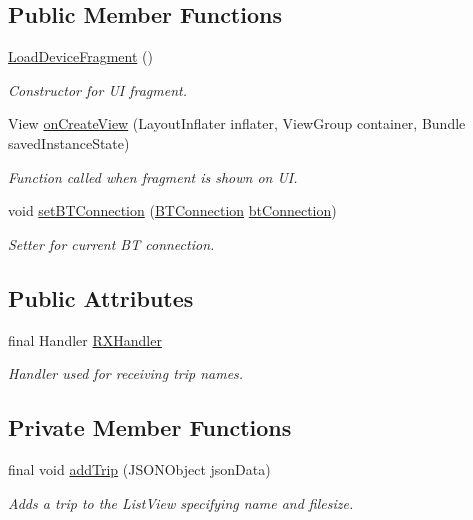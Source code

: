\subsection*{Public Member Functions}
\begin{DoxyCompactItemize}
\item 
\hyperlink{classcom_1_1jack_1_1motorbikestatistics_1_1_load_device_fragment_aaa7330cd6556cd8a87e8b226d796d508}{Load\+Device\+Fragment} ()
\begin{DoxyCompactList}\small\item\em Constructor for UI fragment. \end{DoxyCompactList}\item 
View \hyperlink{classcom_1_1jack_1_1motorbikestatistics_1_1_load_device_fragment_a9ad9f0d9ef69417e2131613009c02338}{on\+Create\+View} (Layout\+Inflater inflater, View\+Group container, Bundle saved\+Instance\+State)
\begin{DoxyCompactList}\small\item\em Function called when fragment is shown on UI. \end{DoxyCompactList}\item 
void \hyperlink{classcom_1_1jack_1_1motorbikestatistics_1_1_load_device_fragment_aec66dc5fd944098de78ace4175fca5b6}{set\+B\+T\+Connection} (\hyperlink{classcom_1_1jack_1_1motorbikestatistics_1_1_b_t_connection}{B\+T\+Connection} \hyperlink{classcom_1_1jack_1_1motorbikestatistics_1_1_load_device_fragment_a7a446c4528638e9d169481c3ff1471b0}{bt\+Connection})
\begin{DoxyCompactList}\small\item\em Setter for current BT connection. \end{DoxyCompactList}\end{DoxyCompactItemize}
\subsection*{Public Attributes}
\begin{DoxyCompactItemize}
\item 
final Handler \hyperlink{classcom_1_1jack_1_1motorbikestatistics_1_1_load_device_fragment_a7c26c8686c290d8766b051f31473d716}{R\+X\+Handler}
\begin{DoxyCompactList}\small\item\em Handler used for receiving trip names. \end{DoxyCompactList}\end{DoxyCompactItemize}
\subsection*{Private Member Functions}
\begin{DoxyCompactItemize}
\item 
final void \hyperlink{classcom_1_1jack_1_1motorbikestatistics_1_1_load_device_fragment_a23957dbe1518052c7167d86938a14c35}{add\+Trip} (J\+S\+O\+N\+Object json\+Data)
\begin{DoxyCompactList}\small\item\em Adds a trip to the List\+View specifying name and filesize. \end{DoxyCompactList}\end{DoxyCompactItemize}
